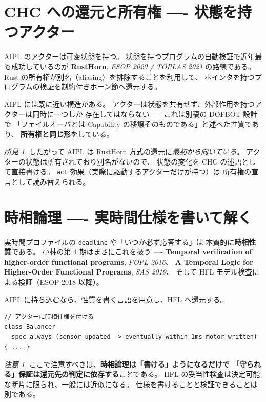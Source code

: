 \documentclass[11pt,a4paper]{ltjsarticle}
\theoremstyle{remark}
\newtheorem{remark}{注意}
\newtheorem{finding}{所見}
\newcommand{\pp}[2]{\textbf{#1}, \emph{#2}}
\begin{document}
\section{CHC への還元と所有権 ---- 状態を持つアクター}

AIPL のアクターは可変状態を持つ。
状態を持つプログラムの自動検証で近年最も成功しているのが
\pp{RustHorn}{ESOP 2020 / TOPLAS 2021} の路線である。
Rust の所有権が別名（aliasing）を排除することを利用して、
ポインタを持つプログラムの検証を制約付きホーン節へ還元する。

AIPL には既に近い構造がある。
アクターは状態を共有せず、外部作用を持つアクターは同時に一つしか
存在してはならない ---- これは別稿の DOFBOT 設計で
「フェイルオーバとは Capability の移譲そのものである」と述べた性質であり、
\textbf{所有権と同じ形}をしている。

\begin{finding}
したがって AIPL は RustHorn 方式の還元に\emph{最初から向いている}。
アクターの状態は所有されており別名がないので、
状態の変化を CHC の述語として直接書ける。
\texttt{act} 効果（実際に駆動するアクターだけが持つ）は
所有権の宣言として読み替えられる。
\end{finding}

\section{時相論理 ---- 実時間仕様を書いて解く}

実時間プロファイルの \texttt{deadline} や「いつか必ず応答する」は
本質的に\textbf{時相性質}である。
小林の第 4 期はまさにこれを扱う ----
\pp{Temporal verification of higher-order functional programs}{POPL 2016}、
\pp{A Temporal Logic for Higher-Order Functional Programs}{SAS 2019}、
そして HFL モデル検査による検証（ESOP 2018 以降）。

AIPL に持ち込むなら、性質を書く言語を用意し、HFL へ還元する。

\begin{lstlisting}[language=AIPL]
// アクターに時相仕様を付ける
class Balancer
  spec always (sensor_updated -> eventually_within 1ms motor_written)
{ ... }
\end{lstlisting}

\begin{remark}
ここで注意すべきは、\textbf{時相論理は「書ける」ようになるだけで
「守られる」保証は還元先の判定に依存する}ことである。
HFL の妥当性検査は決定可能な断片に限られ、一般には近似になる。
仕様を書けることと検証できることは別である。
\end{remark}
\end{document}
